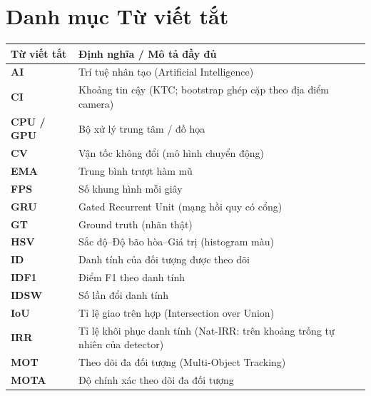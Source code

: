 \documentclass{sicaireport}
\begin{document}
\makecoverpage
\maketitledetailpage

\setcounter{page}{1}

\renewcommand{\contentsname}{Mục lục}
\tableofcontents
\clearpage

\listoffigures
\clearpage

{\linespread{0.93}\selectfont\listoftables}
\clearpage

\chapter*{Danh mục Từ viết tắt}
\begin{table}[htbp]
    \renewcommand{\arraystretch}{1.4}
    \begin{tabularx}{\textwidth}{p{3.5cm} X}
        \toprule
        \textbf{Từ viết tắt} & \textbf{Định nghĩa / Mô tả đầy đủ} \\
        \midrule
        \textbf{AI} & Trí tuệ nhân tạo (Artificial Intelligence) \\
        \textbf{CI} & Khoảng tin cậy (KTC; bootstrap ghép cặp theo địa điểm camera) \\
        \textbf{CPU / GPU} & Bộ xử lý trung tâm / đồ họa \\
        \textbf{CV} & Vận tốc không đổi (mô hình chuyển động) \\
        \textbf{EMA} & Trung bình trượt hàm mũ \\
        \textbf{FPS} & Số khung hình mỗi giây \\
        \textbf{GRU} & Gated Recurrent Unit (mạng hồi quy có cổng) \\
        \textbf{GT} & Ground truth (nhãn thật) \\
        \textbf{HSV} & Sắc độ--Độ bão hòa--Giá trị (histogram màu) \\
        \textbf{ID} & Danh tính của đối tượng được theo dõi \\
        \textbf{IDF1} & Điểm F1 theo danh tính \\
        \textbf{IDSW} & Số lần đổi danh tính \\
        \textbf{IoU} & Tỉ lệ giao trên hợp (Intersection over Union) \\
        \textbf{IRR} & Tỉ lệ khôi phục danh tính (Nat-IRR: trên khoảng trống tự nhiên của detector) \\
        \textbf{MOT} & Theo dõi đa đối tượng (Multi-Object Tracking) \\
        \textbf{MOTA} & Độ chính xác theo dõi đa đối tượng \\

\end{tabularx}
\end{table}
\end{document}
